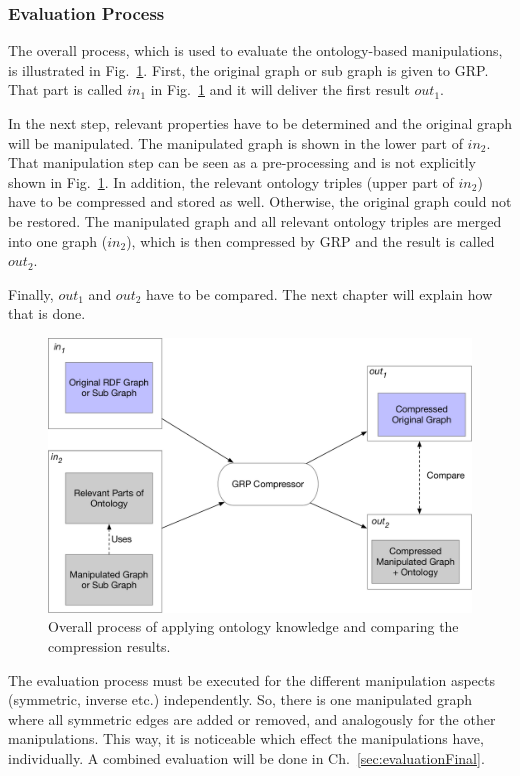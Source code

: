 \clearpage
\subsubsection{Evaluation Process}
The overall process, which is used to evaluate the ontology-based manipulations, is illustrated in Fig.~\ref{fig:overallprocess}. First, the original graph or sub graph is given to GRP. That part is called $in_1$ in Fig.~\ref{fig:overallprocess} and it will deliver the first result $out_1$.

In the next step, relevant properties have to be determined and the original graph will be manipulated. The manipulated graph is shown in the lower part of $in_2$. That manipulation step can be seen as a pre-processing and is not explicitly shown in Fig.~\ref{fig:overallprocess}. In addition, the relevant ontology triples (upper part of $in_2$) have to be compressed and stored as well. Otherwise, the original graph could not be restored. The manipulated graph and all relevant ontology triples are merged into one graph ($in_2$), which is then compressed by GRP and the result is called $out_2$. 

Finally, $out_1$ and $out_2$ have to be compared. The next chapter will explain how that is done.

\begin{figure}
	\centering
	\includegraphics[width=0.8\linewidth]{figures/4_implementation/overallProcess}
	\caption{Overall process of applying ontology knowledge and comparing the compression results.}
	\label{fig:overallprocess}
\end{figure}

The evaluation process must be executed for the different manipulation aspects (symmetric, inverse etc.) independently. So, there is one manipulated graph where all symmetric edges are added or removed, and analogously for the other manipulations. This way, it is noticeable which effect the manipulations have, individually. A combined evaluation will be done in Ch.~\ref{sec:evaluationFinal}.


